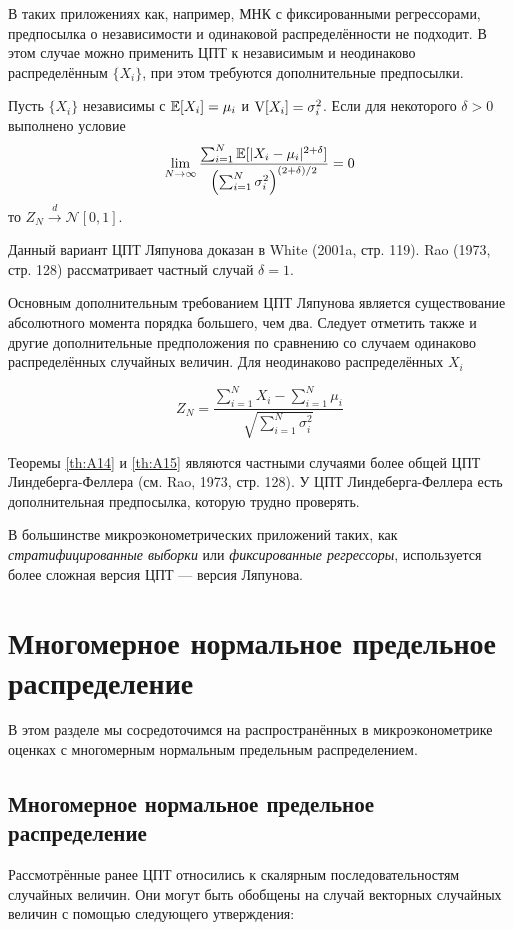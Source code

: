 В таких приложениях как, например, МНК с фиксированными регрессорами, предпосылка о независимости и одинаковой распределённости не подходит. В этом случае можно применить ЦПТ к независимым и неодинаково распределённым $\{X_i\}$, при этом требуются дополнительные предпосылки.

\begin{theorem}
\label{th:A15}
Пусть $\{X_i\}$ независимы с $\mathbb{E}[X_i]=\mu_i$ и $\mathrm{V}[X_i]=\sigma^2_i$. Если для некоторого $\delta>0$ выполнено условие 
\[
\lim_{N\to\infty} \frac{\sum_{i=1}^N \mathbb{E}[|X_i-\mu_i|^{2+\delta}]}{\left( \sum_{i=1}^N \sigma_i^2 \right)^{(2+\delta)/2}} = 0
\]
то $Z_N \overset{d}{\to} \mathcal{N}[0,1]$.
\end{theorem}

Данный вариант ЦПТ Ляпунова доказан в White (2001a, стр. 119). Rao (1973, стр. 128) рассматривает частный случай $\delta=1$.

Основным дополнительным требованием ЦПТ Ляпунова является существование абсолютного момента порядка большего, чем два. Следует отметить также и другие дополнительные предположения по сравнению со случаем одинаково распределённых случайных величин. Для неодинаково распределённых $X_i$ 

\[
Z_N=\frac{\sum_{i=1}^N X_i - \sum_{i=1}^N \mu_i}{\sqrt{\sum_{i=1}^N \sigma^2_i}}
\]

Теоремы \ref{th:A14} и \ref{th:A15} являются частными случаями более общей ЦПТ Линдеберга-Феллера (см. Rao, 1973, стр. 128). У ЦПТ Линдеберга-Феллера есть дополнительная предпосылка, которую трудно проверять.

В большинстве микроэконометрических приложений таких, как \textit{стратифицированные выборки} или \textit{фиксированные регрессоры}, используется более сложная версия ЦПТ --- версия Ляпунова.

\section{Многомерное нормальное предельное распределение}

В этом разделе мы сосредоточимся на распространённых в микроэконометрике оценках с многомерным нормальным предельным распределением.

\subsection{Многомерное нормальное предельное распределение}

Рассмотрённые ранее ЦПТ относились к скалярным последовательностям случайных величин. Они могут быть обобщены на случай векторных случайных величин с помощью следующего утверждения:

